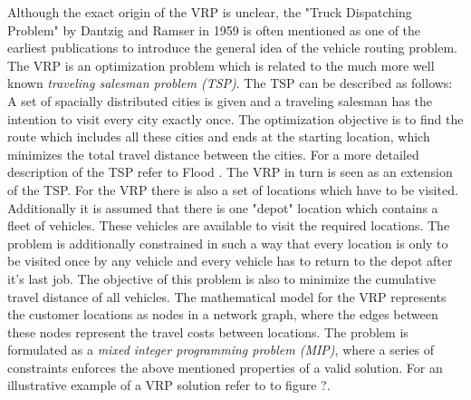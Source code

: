 Although the exact origin of the VRP is unclear, the "Truck Dispatching Problem" by Dantzig and Ramser in 1959 \cite{dantzig_truck_1959} is often mentioned as one of the earliest publications to introduce the general idea of the vehicle routing problem.\\
The VRP is an optimization  problem which is related to the much more well known \textit{traveling salesman problem (TSP)}. The TSP can be described as follows: A set of spacially distributed cities is given and a traveling salesman has the intention to visit every city exactly once. The optimization objective is to find the route which includes all these cities and ends at the starting location, which minimizes the total travel distance between the cities. For a more detailed description of the TSP refer to Flood  \cite{flood_traveling-salesman_1956}. The VRP in turn is seen as an extension of the TSP. For the VRP there is also a set of locations which have to be visited. Additionally it is assumed that there is one "depot" location which contains a fleet of vehicles. These vehicles are available to visit the required locations. The problem is additionally constrained in such a way that every location is only to be visited once by any vehicle and every vehicle has to return to the depot after it's last job. The objective of this problem is also to minimize the cumulative travel distance of all vehicles. The mathematical model for the VRP represents the customer locations as nodes in a network graph, where the edges between these nodes represent the travel costs between locations. The problem is formulated as a \textit{mixed integer programming problem (MIP)}, where a series of constraints enforces the above mentioned properties of a valid solution. For an illustrative example of a VRP solution refer to to figure ?. \\
